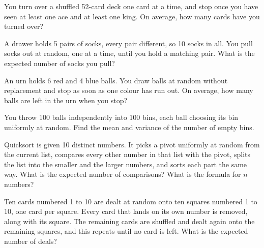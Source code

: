 \begin{question}\label{iq:iv1:expectation-and-indicators:17}
You turn over a shuffled 52-card deck one card at a time, and stop once you have seen at least one ace and at
least one king. On average, how many cards have you turned over?
\end{question}

\begin{question}\label{iq:iv1:expectation-and-indicators:18}
A drawer holds 5 pairs of socks, every pair different, so 10 socks in all. You pull socks out at random, one at a
time, until you hold a matching pair. What is the expected number of socks you pull?
\end{question}

\begin{question}\label{iq:iv1:expectation-and-indicators:19}
An urn holds 6 red and 4 blue balls. You draw balls at random without replacement and stop as soon as one colour
has run out. On average, how many balls are left in the urn when you stop?
\end{question}

\begin{question}\label{iq:iv1:expectation-and-indicators:20}
You throw 100 balls independently into 100 bins, each ball choosing its bin uniformly at random. Find the mean and variance of the number of empty bins.
\end{question}

\begin{question}\label{iq:iv1:expectation-and-indicators:21}
Quicksort is given 10 distinct numbers. It picks a pivot uniformly at random from the current list, compares every
other number in that list with the pivot, splits the list into the smaller and the larger numbers, and sorts each
part the same way. What is the expected number of comparisons? What is the formula for $n$ numbers?
\end{question}

\begin{question}\label{iq:iv1:expectation-and-indicators:22}
Ten cards numbered 1 to 10 are dealt at random onto ten squares numbered 1 to 10, one card per square. Every card
that lands on its own number is removed, along with its square. The remaining cards are shuffled and dealt again
onto the remaining squares, and this repeats until no card is left. What is the expected number of deals?
\end{question}

